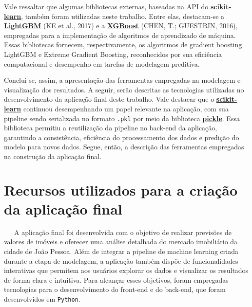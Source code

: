 \documentclass[
  12pt,
  a4paper,
]{scrreprt}
\begin{document}
Vale ressaltar que algumas bibliotecas externas, baseadas na API do
\href{https://scikit-learn.org/stable/}{\textbf{scikit-learn}}, também
foram utilizadas neste trabalho. Entre elas, destacam-se a
\href{https://lightgbm.readthedocs.io/en/stable/}{\textbf{LightGBM}} (KE
et al., 2017) e a
\href{https://xgboost.readthedocs.io/en/stable/}{\textbf{XGBoost}}
(CHEN, T.; GUESTRIN, 2016), empregadas para a implementação de
algoritmos de aprendizado de máquina. Essas bibliotecas fornecem,
respectivamente, os algoritmos de gradient boosting LightGBM e Extreme
Gradient Boosting, reconhecidos por sua eficiência computacional e
desempenho em tarefas de modelagem preditiva.

\vspace{12pt}

Conclui-se, assim, a apresentação das ferramentas empregadas na
modelagem e visualização dos resultados. A seguir, serão descritas as
tecnologias utilizadas no desenvolvimento da aplicação final deste
trabalho. Vale destacar que o
\href{https://scikit-learn.org/stable/}{\textbf{scikit-learn}} continuou
desempenhando um papel relevante na aplicação, com sua pipeline sendo
serializada no formato \texttt{.pkl} por meio da biblioteca
\href{https://docs.python.org/3/library/pickle.html}{\textbf{pickle}}.
Essa biblioteca permitiu a reutilização da pipeline no back-end da
aplicação, garantindo a consistência, eficiência do processamento dos
dados e predição do modelo para novos dados. Segue, então, a descrição
das ferramentas empregadas na construção da aplicação final.

\section{Recursos utilizados para a criação da aplicação
final}\label{recursos-utilizados-para-a-criauxe7uxe3o-da-aplicauxe7uxe3o-final}

~~~A aplicação final foi desenvolvida com o objetivo de realizar
previsões de valores de imóveis e oferecer uma análise detalhada do
mercado imobiliário da cidade de João Pessoa. Além de integrar a
pipeline de machine learning criada durante a etapa de modelagem, a
aplicação também dispõe de funcionalidades interativas que permitem aos
usuários explorar os dados e visualizar os resultados de forma clara e
intuitiva. Para alcançar esses objetivos, foram empregadas tecnologias
para o desenvolvimento do front-end e do back-end, que foram
desenvolvidos em \texttt{Python}.

\vspace{12pt}
\end{document}
